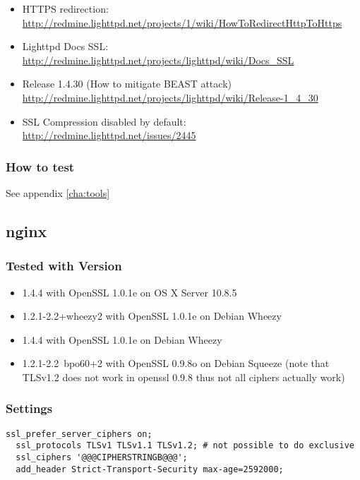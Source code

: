 \begin{itemize}
        \item HTTPS redirection: \url{http://redmine.lighttpd.net/projects/1/wiki/HowToRedirectHttpToHttps}
        \item Lighttpd Docs SSL: \url{http://redmine.lighttpd.net/projects/lighttpd/wiki/Docs\_SSL}
        \item Release 1.4.30 (How to mitigate BEAST attack) \url{http://redmine.lighttpd.net/projects/lighttpd/wiki/Release-1\_4\_30}
        \item SSL Compression disabled by default: \url{http://redmine.lighttpd.net/issues/2445}
\end{itemize}




\subsubsection{How to test} 
See appendix \ref{cha:tools}



\subsection{nginx}

\subsubsection{Tested with Version} 
\begin{itemize}
\item 1.4.4 with OpenSSL 1.0.1e on OS X Server 10.8.5
\item 1.2.1-2.2+wheezy2 with OpenSSL 1.0.1e on Debian Wheezy
\item 1.4.4 with OpenSSL 1.0.1e on Debian Wheezy
\item 1.2.1-2.2~bpo60+2 with OpenSSL 0.9.8o on Debian Squeeze (note that TLSv1.2 does not work in openssl 0.9.8 thus not all ciphers actually work)
\end{itemize}


\subsubsection{Settings}

\begin{lstlisting}[breaklines]
  ssl_prefer_server_ciphers on;
  ssl_protocols TLSv1 TLSv1.1 TLSv1.2; # not possible to do exclusive
  ssl_ciphers '@@@CIPHERSTRINGB@@@';
  add_header Strict-Transport-Security max-age=2592000;
\end{lstlisting}

